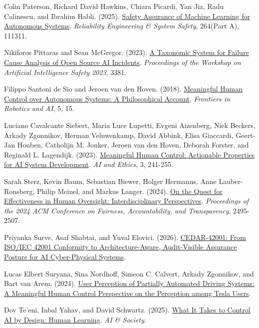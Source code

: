 \documentclass[11pt]{article}
\newenvironment{TAEReferences}{%
  \begin{list}{}{%
    \renewcommand{\makelabel}[1]{}%
    \setlength{\labelwidth}{0pt}%
    \setlength{\labelsep}{0pt}%
    \setlength{\leftmargin}{0.5in}%
    \setlength{\itemindent}{-0.5in}%
    \setlength{\itemsep}{0.45em}%
    \setlength{\parsep}{0pt}%
    \setlength{\topsep}{0.25em}%
  }%
}{\end{list}}
\begin{document}
\begin{TAEReferences}
\item Colin Paterson, Richard David Hawkins, Chiara Picardi, Yan Jia, Radu Calinescu, and Ibrahim Habli. (2025). \href{https://doi.org/10.1016/j.ress.2025.111311}{Safety Assurance of Machine Learning for Autonomous Systems}. \emph{Reliability Engineering \& System Safety}, 264(Part A), 111311.
\item Nikiforos Pittaras and Sean McGregor. (2023). \href{https://ceur-ws.org/Vol-3381/17.pdf}{A Taxonomic System for Failure Cause Analysis of Open Source AI Incidents}. \emph{Proceedings of the Workshop on Artificial Intelligence Safety 2023}, 3381.
\item Filippo Santoni de Sio and Jeroen van den Hoven. (2018). \href{https://doi.org/10.3389/frobt.2018.00015}{Meaningful Human Control over Autonomous Systems: A Philosophical Account}. \emph{Frontiers in Robotics and AI}, 5, 15.
\item Luciano Cavalcante Siebert, Maria Luce Lupetti, Evgeni Aizenberg, Niek Beckers, Arkady Zgonnikov, Herman Veluwenkamp, David Abbink, Elisa Giaccardi, Geert-Jan Houben, Catholijn M. Jonker, Jeroen van den Hoven, Deborah Forster, and Reginald L. Lagendijk. (2023). \href{https://doi.org/10.1007/s43681-022-00167-3}{Meaningful Human Control: Actionable Properties for AI System Development}. \emph{AI and Ethics}, 3, 241-255.
\item Sarah Sterz, Kevin Baum, Sebastian Biewer, Holger Hermanns, Anne Lauber-Ronsberg, Philip Meinel, and Markus Langer. (2024). \href{https://doi.org/10.1145/3630106.3659051}{On the Quest for Effectiveness in Human Oversight: Interdisciplinary Perspectives}. \emph{Proceedings of the 2024 ACM Conference on Fairness, Accountability, and Transparency}, 2495-2507.
\item Priyanka Surve, Asaf Shabtai, and Yuval Elovici. (2026). \href{https://doi.org/10.48550/arXiv.2606.21276}{CEDAR-42001: From ISO/IEC 42001 Conformity to Architecture-Aware, Audit-Visible Assurance Posture for AI Cyber-Physical Systems}.
\item Lucas Elbert Suryana, Sina Nordhoff, Simeon C. Calvert, Arkady Zgonnikov, and Bart van Arem. (2024). \href{https://doi.org/10.48550/arXiv.2402.08080}{User Perception of Partially Automated Driving Systems: A Meaningful Human Control Perspective on the Perception among Tesla Users}.
\item Dov Te'eni, Inbal Yahav, and David Schwartz. (2025). \href{https://doi.org/10.1007/s00146-025-02401-y}{What It Takes to Control AI by Design: Human Learning}. \emph{AI \& Society}.

\end{TAEReferences}
\end{document}

